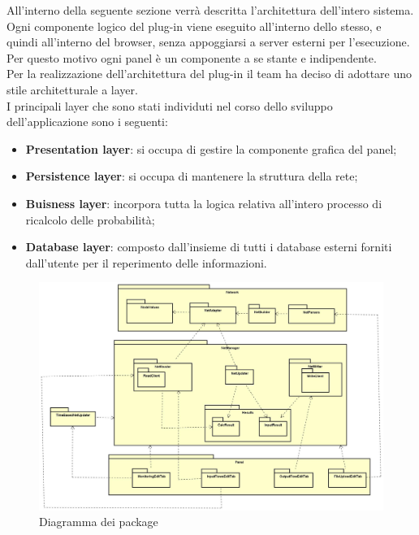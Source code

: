 \pagebreak
{}
All'interno della seguente sezione verrà descritta l'architettura dell'intero sistema.\\
Ogni componente logico del plug-in viene eseguito all'interno dello stesso, e quindi all'interno del browser, senza appoggiarsi a server esterni per l'esecuzione. Per questo motivo ogni panel è un componente a se stante e indipendente. \\
Per la realizzazione dell'architettura del plug-in il team ha deciso di adottare uno stile architetturale a layer.\\
I principali layer che sono stati individuti nel corso dello sviluppo dell'applicazione sono i seguenti:
\begin{itemize}
	\item{\textbf{Presentation layer}: si occupa di gestire la componente grafica del panel;}
	\item{\textbf{Persistence layer}: si occupa di mantenere la struttura della rete;}
	\item{\textbf{Buisness layer}: incorpora tutta la logica relativa all’intero processo di ricalcolo delle probabilità;}
	\item{\textbf{Database layer}: composto dall’insieme di tutti i database esterni forniti dall’utente per il reperimento delle informazioni.}
\end{itemize}
\begin{figure} [H]
	\centering
	\includegraphics[scale=0.25]{Img/Diagramma_Package}
	\caption{Diagramma dei package}\label{}
\end{figure}
